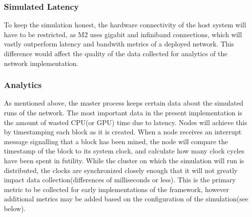 \documentclass[11pt]{article}
\begin{document}
    \subsubsection{Simulated Latency}
    To keep the simulation honest, the hardware connectivity of the host system will have to be restricted, as M2 uses
    gigabit and infiniband connections, which will vastly outperform latency and bandwith metrics of a deployed network.
    This difference would affect the quality of the data collected for analytics of the network implementation.
    \subsubsection{Analytics}
    As mentioned above, the master process keeps certain data about the simulated runs of the network. %
    The most important data in the present implementation is the amount of wasted CPU(or GPU) time due to latency.
    Nodes will achieve this by timestamping each block as it is created.
    When a node receives an interrupt message signalling that a block has been mined, the node will compare the timestamp
    of the block to its system clock, and calculate how many clock cycles have been spent in futility.
    While the cluster on which the simulation will run is distributed, the clocks are synchronized closely enough that
    it will not greatly impact data collection(differences of milliseconds or less).
    This is the primary metric to be collected for early implementations of the framework, however additional metrics
    may be added based on the configuration of the simulation(see below). %
\end{document}
